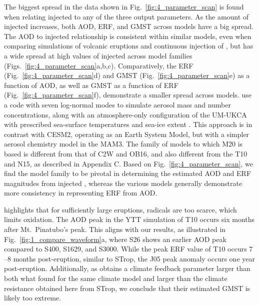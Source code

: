 \documentclass[draft]{agujournal2019}
\begin{document}
  The biggest spread in the data shown in Fig.~\ref{fig:4_parameter_scan} is found when
  relating injected  to any of the three output parameters. As the amount of
  injected  increases, both AOD, ERF, and GMST across models have a big spread.
  The AOD to injected  relationship is consistent within similar models, even
  when comparing simulations of volcanic eruptions \cite{timmreck2010} and continuous
  injection of  \cite{niemeier2015}, but has a wide spread at high values of
  injected  across model families (Figs.~\ref{fig:4_parameter_scan}a,b,c).
  Comparatively, the ERF (Fig.~\ref{fig:4_parameter_scan}d) and GMST
  (Fig.~\ref{fig:4_parameter_scan}e) as a function of AOD, as well as GMST as a function
  of ERF (Fig.~\ref{fig:4_parameter_scan}f), demonstrate a smaller spread across models.
   use a code with seven log-normal
  modes to simulate aerosol mass and number concentrations, along with an
  atmosphere-only configuration of the UM-UKCA with prescribed sea-surface temperatures
  and sea-ice extent \cite{marshall2019}. This approach is in contrast with CESM2,
  operating as an Earth System Model, but with a simpler aerosol chemistry model in the
  MAM3. The family of models to which M20 is based is different from that of C2W and
  OB16, and also different from the T10 and N15, as described in Appendix C. Based on
  Fig.~\ref{fig:4_parameter_scan}, we find the model family to be pivotal in determining
  the estimated AOD and ERF magnitudes from injected , whereas the various
  models generally demonstrate more consistency in representing ERF from AOD.

   highlights that for sufficiently large eruptions, 
  radicals are too scarce, which limits  oxidation. The AOD peak in the YTT
  simulation of T10 occurs six months after Mt.\ Pinatubo's peak. This aligns with our
  results, as illustrated in Fig.~\ref{fig:1_compare_waveform}a, where S26 shows an
  earlier AOD peak compared to S400, S1629, and S3000. While the peak ERF value of T10
  occurs \(7\)--\(8\) months post-eruption, similar to STrop, the J05 peak anomaly
  occurs one year post-eruption. Additionally, as  obtains a climate
  feedback parameter larger than both what  found for the same
  climate model and larger than the climate resistance obtained here from STrop, we
  conclude that their estimated GMST is likely too extreme.
\end{document}
